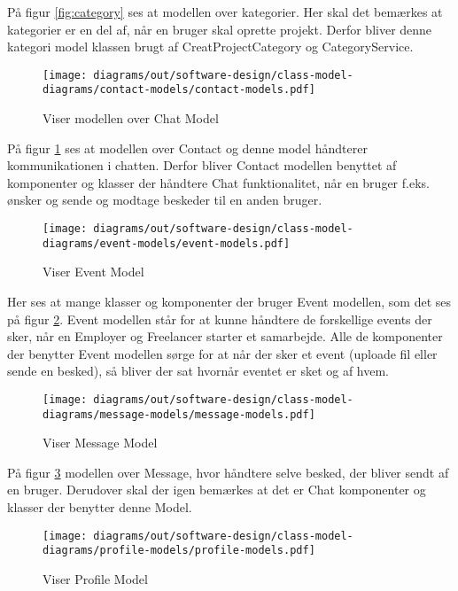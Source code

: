 På figur \ref{fig:category} ses at modellen over kategorier. Her skal det bemærkes at kategorier er en del af, når en bruger skal oprette projekt. Derfor bliver denne kategori model klassen brugt af CreatProjectCategory og CategoryService.

\begin{figure}[H]
    \centering
\texttt{[image: diagrams/out/software-design/class-model-diagrams/contact-models/contact-models.pdf]}
\caption{Viser modellen over Chat Model}
\label{fig:contact}
\end{figure}

På figur \ref{fig:contact} ses at modellen over Contact og denne model håndterer kommunikationen i chatten. Derfor bliver Contact modellen benyttet af komponenter og klasser der håndtere Chat funktionalitet, når en bruger f.eks. ønsker og sende og modtage beskeder til en anden bruger.


\begin{figure}[H]
    \centering
\texttt{[image: diagrams/out/software-design/class-model-diagrams/event-models/event-models.pdf]}
\caption{Viser Event Model}
\label{fig:event}
\end{figure}

Her ses at mange klasser og komponenter der bruger Event modellen, som det ses på figur \ref{fig:event}. Event modellen står for at kunne håndtere de forskellige events der sker, når en Employer og Freelancer starter et samarbejde. Alle de komponenter der benytter Event modellen sørge for at når der sker et event (uploade fil eller sende en besked), så bliver der sat hvornår eventet er sket og af hvem.
\newpage
\begin{figure}[H]
    \centering
\texttt{[image: diagrams/out/software-design/class-model-diagrams/message-models/message-models.pdf]}
\caption{Viser Message Model}
\label{fig:message}
\end{figure}

På figur \ref{fig:message} modellen over Message, hvor håndtere selve besked, der bliver sendt af en bruger. Derudover skal der igen bemærkes at det er Chat komponenter og klasser der benytter denne Model.


\begin{figure}[H]
    \centering
\texttt{[image: diagrams/out/software-design/class-model-diagrams/profile-models/profile-models.pdf]}
\caption{Viser Profile Model}
\label{fig:profile}
\end{figure}

